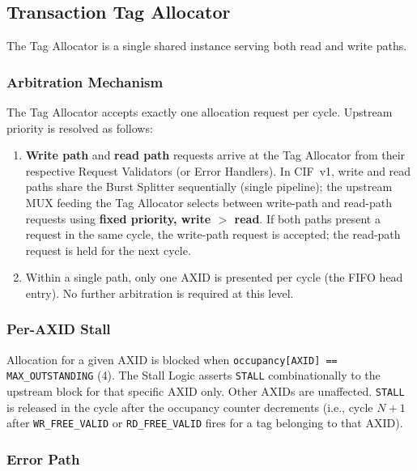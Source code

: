 \subsection{Transaction Tag Allocator}

The Tag Allocator is a single shared instance serving both read and write
paths.

\subsubsection*{Arbitration Mechanism}

The Tag Allocator accepts exactly one allocation request per cycle.
Upstream priority is resolved as follows:

\begin{enumerate}
  \item \textbf{Write path} and \textbf{read path} requests arrive at the Tag
        Allocator from their respective Request Validators (or Error Handlers).
        In CIF~v1, write and read paths share the Burst Splitter sequentially
        (single pipeline); the upstream MUX feeding the Tag Allocator selects
        between write-path and read-path requests using \textbf{fixed
        priority, write $>$ read}. If both paths present a request in the same
        cycle, the write-path request is accepted; the read-path request is held
        for the next cycle.
  \item Within a single path, only one AXID is presented per cycle (the FIFO
        head entry). No further arbitration is required at this level.
\end{enumerate}

\subsubsection*{Per-AXID Stall}

Allocation for a given AXID is blocked when
\texttt{occupancy[AXID] == MAX\_OUTSTANDING} (4). The Stall Logic asserts
\texttt{STALL} combinationally to the upstream block for that specific AXID
only. Other AXIDs are unaffected. \texttt{STALL} is released in the cycle
after the occupancy counter decrements (i.e., cycle $N+1$ after
\texttt{WR\_FREE\_VALID} or \texttt{RD\_FREE\_VALID} fires for a tag belonging
to that AXID).

\subsubsection*{Error Path}

